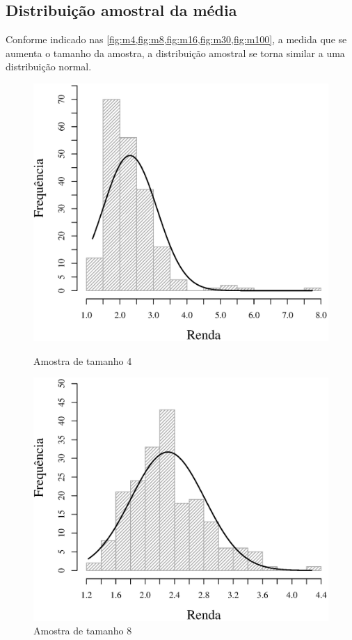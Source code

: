 \subsection{Distribuição amostral da média}
Conforme indicado nas \autoref{fig:m4,fig:m8,fig:m16,fig:m30,fig:m100}, a medida que se aumenta o tamanho da amostra,
a distribuição amostral se torna similar a uma distribuição normal.

\begin{figure}[h]
\begin{minipage}{0.50\textwidth}
	\includegraphics[width=\linewidth]{plots/histogram_renda_n4.eps}
	\caption{Amostra de tamanho 4}
	\label{fig:m4}
\end{minipage}
\begin{minipage}{0.50\textwidth}
	\includegraphics[width=\linewidth]{plots/histogram_renda_n8.eps}
	\caption{Amostra de tamanho 8}
	\label{fig:m8}
\end{minipage}
\end{figure}

